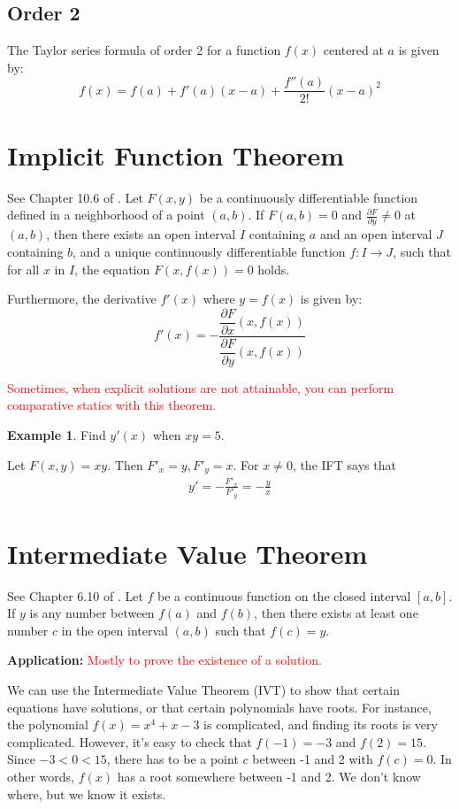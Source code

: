 \documentclass[11pt,a4paper]{book}
\newcommand{\red}[1]{\textcolor{red}{#1}}
\theoremstyle{definition}\newtheorem{definition}{Definition}
\theoremstyle{definition}\newtheorem{fact}{Fact}
\theoremstyle{definition}\newtheorem{remark}{Remark}
\theoremstyle{definition}\newtheorem{ex}{Ex.}
\theoremstyle{definition}\newtheorem{project}{Project}
\theoremstyle{definition}\newtheorem{problem}{Problem}
\theoremstyle{definition}\newtheorem{example}{Example}
\numberwithin{theorem}{section}
\numberwithin{corollary}{chapter}
\numberwithin{assumption}{chapter}
\numberwithin{definition}{chapter}
\numberwithin{prop}{chapter}
\numberwithin{notation}{chapter}
\numberwithin{problem}{chapter}
\numberwithin{example}{chapter}
\numberwithin{fact}{chapter}
\numberwithin{ex}{chapter}
\begin{document}
\begin{appendices}
	\subsection*{Order 2}
	The Taylor series formula of order 2 for a function $f(x)$ centered at $a$ is given by:
	\[
	f(x) = f(a) + f'(a)(x - a) + \frac{f''(a)}{2!}(x - a)^2
	\]
	
	\section{Implicit Function Theorem}
	See Chapter 10.6 of \citet{springcamp}. Let \( F(x, y) \) be a continuously differentiable function defined in a neighborhood of a point \( (a, b) \). If \( F(a, b) = 0 \) and \( \frac{\partial F}{\partial y} \neq 0 \) at \( (a, b) \), then there exists an open interval \( I \) containing \( a \) and an open interval \( J \) containing \( b \), and a unique continuously differentiable function \( f : I \to J \), such that for all \( x \) in \( I \), the equation \( F(x, f(x)) = 0 \) holds.
	
	Furthermore, the derivative \( f'(x) \) where $y = f(x)$ is given by:
	\[ f'(x) = -\dfrac{\dfrac{\partial F}{\partial x}(x, f(x))}{\dfrac{\partial F}{\partial y}(x, f(x))} \]
	
	\red{Sometimes, when explicit solutions are not attainable, you can perform comparative statics with this theorem.} 	
	\begin{example}
		Find $y'(x)$ when $xy=5$.
		
		Let $F(x,y) = xy$. Then $F'_x = y, F'_y = x$. For $x\neq 0$, the IFT says that
		\begin{align*}
			y' = - \frac{F'_x}{F'_y} = - \frac{y}{x} 
		\end{align*}
	\end{example}
	
	
	\section{Intermediate Value Theorem}
	See Chapter 6.10 of \citet{springcamp}. Let \( f \) be a continuous function on the closed interval \([a, b]\). If \( y \) is any number between \( f(a) \) and \( f(b) \), then there exists at least one number \( c \) in the open interval \((a, b)\) such that \( f(c) = y \).
	
	\textbf{Application:} \red{Mostly to prove the existence of a solution.}
	
	We can use the Intermediate Value Theorem (IVT) to show that certain equations have solutions, or that certain polynomials have roots. For instance, the polynomial \( f(x) = x^4 + x - 3 \) is complicated, and finding its roots is very complicated. However, it's easy to check that \( f(-1) = -3 \) and \( f(2) = 15 \). Since \( -3 < 0 < 15 \), there has to be a point \( c \) between -1 and 2 with \( f(c) = 0 \). In other words, \( f(x) \) has a root somewhere between -1 and 2. We don't know where, but we know it exists.
	

\end{appendices}
\end{document}
